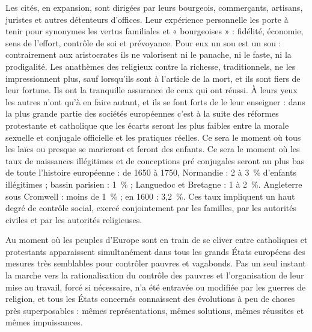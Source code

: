  Les cités, en expansion, sont dirigées par leurs bourgeois, commerçants, artisans, juristes et autres détenteurs d'offices. Leur expérience personnelle les porte à tenir pour synonymes les vertus familiales et « bourgeoises » : fidélité, économie, sens de l'effort, contrôle de soi et prévoyance. Pour eux un sou est un sou : contrairement aux aristocrates ils ne valorisent ni le panache, ni le faste, ni la prodigalité. Les anathèmes des religieux contre la richesse, traditionnels, ne les impressionnent plus, sauf lorsqu'ils sont à l'article de la mort, et ils sont fiers de leur fortune. Ils ont la tranquille assurance de ceux qui ont réussi. À leurs yeux les autres n'ont qu'à en faire autant, et ils se font forts de le leur enseigner : dans la plus grande partie des sociétés européennes c'est à la suite des réformes protestante et catholique que les écarts seront les plus faibles entre la morale sexuelle et conjugale officielle et les pratiques réelles. Ce sera le moment où tous les laïcs ou presque se marieront et feront des enfants. Ce sera le moment où les taux de naissances illégitimes et de conceptions pré conjugales seront au plus bas de toute l'histoire européenne : de 1650 à 1750, Normandie : 2 à 3~\% d'enfants illégitimes ; bassin parisien : 1~\% ; Languedoc et Bretagne : 1 à 2~\%. Angleterre sous Cromwell : moins de 1~\% ; en 1600 : 3,2~\%. Ces taux impliquent un haut degré de contrôle social, exercé conjointement par les familles, par les autorités civiles et par les autorités religieuses.

 Au moment où les peuples d'Europe sont en train de se cliver entre catholiques et protestants apparaissent simultanément dans tous les grands États européens des mesures très semblables pour contrôler pauvres et vagabonds. Pas un seul instant la marche vers la rationalisation du contrôle des pauvres et l'organisation de leur mise au travail, forcé si nécessaire, n'a été entravée ou modifiée par les guerres de religion, et tous les États concernés connaissent des évolutions à peu de choses près superposables : mêmes représentations, mêmes solutions, mêmes réussites et mêmes impuissances. 


